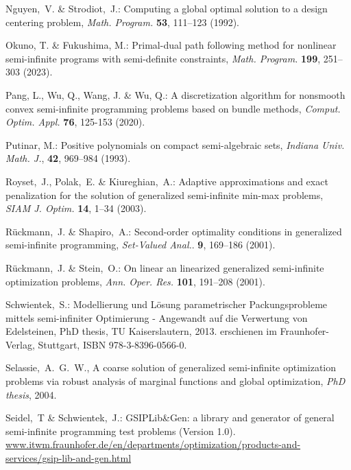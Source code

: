 \documentclass{amsart}
\theoremstyle{plain}
\numberwithin{equation}{section}
\begin{document}
\begin{thebibliography}{100}
			Nguyen,~V. \& Strodiot,~J.: 
			Computing a global optimal solution to a design centering problem,
			{\em Math. Program.} \textbf{53}, 111--123 (1992).
			
			
			Okuno, T. \& Fukushima, M.:
			Primal-dual path following method for nonlinear semi-infinite programs with semi-definite constraints,
			{\em Math. Program.} \textbf{199}, 251--303 (2023).
			
			Pang, L., Wu, Q., Wang, J. \& Wu, Q.: 
			A discretization algorithm for nonsmooth convex semi-infinite programming problems based on bundle methods,
			{\em Comput. Optim. Appl.} {\bf 76}, 125-153 (2020).
			
			
			Putinar, M.:
			Positive polynomials on compact semi-algebraic sets, 
			{\em Indiana Univ. Math. J.}, {\bf 42}, 969--984 (1993).
			
			Royset,~J., Polak,~E. \& Kiureghian,~A.: 
			Adaptive approximations and exact penalization for the solution of generalized semi-infinite min-max problems, 
			{\em SIAM J. Optim.} \textbf{14}, 1--34 (2003).
			
			
			R\"{u}ckmann,~J. \&  Shapiro,~A.:
			Second-order optimality conditions in generalized semi-infinite programming,
			{\em Set-Valued Anal.}. \textbf{9}, 169--186 (2001).
			
			R\"{u}ckmann,~J. \&  Stein,~O.:
			On linear an linearized generalized semi-infinite optimization problems,
			{\em Ann. Oper. Res.} \textbf{101}, 191--208 (2001).
			
			Schwientek,~S.: 
			Modellierung und L\"{o}sung parametrischer Packungsprobleme mittels semi-infiniter
			Optimierung - Angewandt auf die Verwertung von Edelsteinen,
			PhD thesis, TU Kaiserslautern,
			2013. erschienen im Fraunhofer-Verlag, Stuttgart, ISBN 978-3-8396-0566-0.
			
			Selassie,~A.~G.~W.,
			A coarse solution of generalized semi-infinite optimization problems via robust
			analysis of marginal functions and global optimization,
			{\em PhD thesis}, 2004.
			
			Seidel,~T \& Schwientek,~J.:
			GSIPLib\&Gen: a library and generator of general semi-infinite programming test problems (Version 1.0).
			\url{www.itwm.fraunhofer.de/en/departments/optimization/products-and-services/gsip-lib-and-gen.html}
			

\end{thebibliography}
\end{document}

